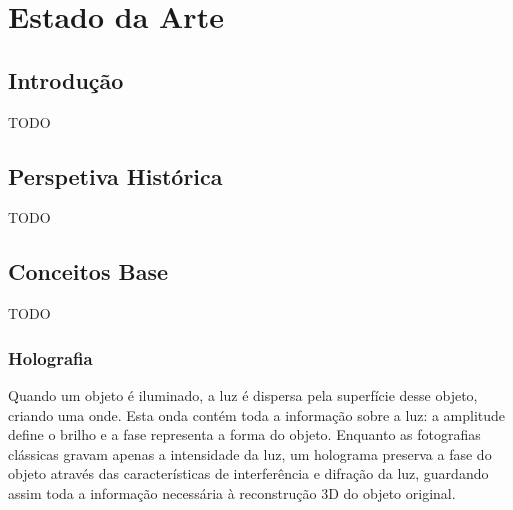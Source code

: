 \chapter{Estado da Arte}
\label{ch::estado-arte}

\section{Introdução}
\label{sec::estado-arte:intro}

TODO





\section{Perspetiva Histórica}
\label{sec::estado-arte:historia}

TODO


\section{Conceitos Base}
\label{sec::estado-arte:conceitos}

TODO

\subsection{Holografia}
\label{ssec::estado-arte:holografia}

Quando um objeto é iluminado, a luz é dispersa pela superfície desse objeto, criando uma onde. Esta onda contém toda a informação sobre a luz: a amplitude define o brilho e a fase representa a forma do objeto. Enquanto as fotografias clássicas gravam apenas a intensidade da luz, um holograma preserva a fase do objeto através das características de interferência e difração da luz, guardando assim toda a informação necessária à reconstrução 3D do objeto original.


